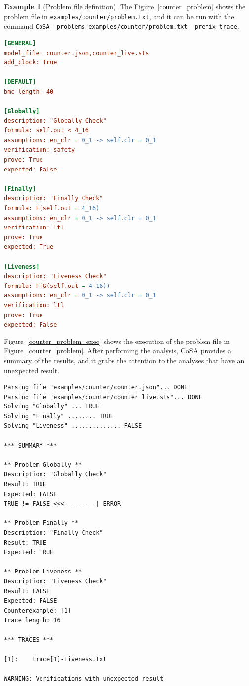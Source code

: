 \documentclass{article}
\theoremstyle{definition}
\newtheorem{example}{Example}[section]
\begin{document}
\begin{example}[Problem file definition]
The Figure~\ref{counter_problem} shows the problem file in
\texttt{examples/counter/problem.txt}, and it can be run with the
command \texttt{CoSA --problems examples/counter/problem.txt --prefix
  trace}.
  
\begin{lstlisting}[frame=single,language=Ini,caption=Problem file in \texttt{examples/counter/problem.txt},label=counter_problem]
[GENERAL]
model_file: counter.json,counter_live.sts
add_clock: True

[DEFAULT]
bmc_length: 40

[Globally]
description: "Globally Check"
formula: self.out < 4_16
assumptions: en_clr = 0_1 -> self.clr = 0_1
verification: safety
prove: True
expected: False

[Finally]
description: "Finally Check"
formula: F(self.out = 4_16)
assumptions: en_clr = 0_1 -> self.clr = 0_1
verification: ltl
prove: True
expected: True

[Liveness]
description: "Liveness Check"
formula: F(G(self.out = 4_16))
assumptions: en_clr = 0_1 -> self.clr = 0_1
verification: ltl
prove: True
expected: False
\end{lstlisting}

Figure~\ref{counter_problem_exec} shows the execution of the problem
file in Figure~\ref{counter_problem}. After performing the analysis,
CoSA provides a summary of the results, and it grabs the attention to
the analyses that have an unexpected result.

\begin{lstlisting}[frame=single,language=ets,caption=Analysis for the problem in Figure~\ref{counter_problem},label=counter_problem_exec]
Parsing file "examples/counter/counter.json"... DONE
Parsing file "examples/counter/counter_live.sts"... DONE
Solving "Globally" ... TRUE
Solving "Finally" ........ TRUE
Solving "Liveness" .............. FALSE

*** SUMMARY ***

** Problem Globally **
Description: "Globally Check"
Result: TRUE
Expected: FALSE
TRUE != FALSE <<<---------| ERROR

** Problem Finally **
Description: "Finally Check"
Result: TRUE
Expected: TRUE

** Problem Liveness **
Description: "Liveness Check"
Result: FALSE
Expected: FALSE
Counterexample: [1]
Trace length: 16

*** TRACES ***

[1]:	trace[1]-Liveness.txt

WARNING: Verifications with unexpected result
\end{lstlisting}

\end{example}
\end{document}
